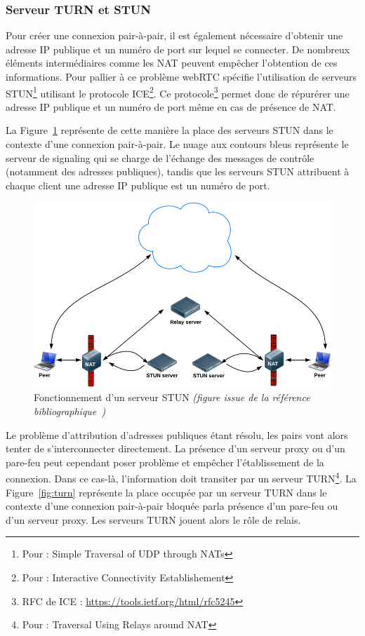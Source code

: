 \documentclass{tnreport}
\begin{document}
\subsubsection{Serveur TURN et STUN}

Pour créer une connexion pair-à-pair, il est également nécessaire d'obtenir une adresse IP publique et un numéro de port sur lequel se connecter. De nombreux éléments intermédiaires comme les NAT peuvent empêcher l'obtention de ces informations. Pour pallier à ce problème webRTC spécifie l'utilisation de serveurs STUN\footnote{Pour : Simple Traversal of UDP through NATs} utilisant le protocole ICE\footnote{Pour : Interactive Connectivity Establishement}. Ce protocole\footnote{RFC de ICE : \url{https://tools.ietf.org/html/rfc5245}} permet donc de répurérer une adresse IP publique et un numéro de port même en cas de présence de NAT.

La Figure~\ref{fig:stun} représente de cette manière la place des serveurs STUN dans le contexte d'une connexion pair-à-pair. Le nuage aux contours bleus représente le serveur de signaling qui se charge de l'échange des messages de contrôle (notamment des adresses publiques), tandis que les serveurs STUN attribuent à chaque client une adresse IP publique est un numéro de port.

\begin{figure}[!h]
  \centering
  \includegraphics[width=14cm]{figures/stun}
  \caption{Fonctionnement d'un serveur STUN \emph{(figure issue de la référence bibliographique~\cite{GettingStartedwithWebRTC})}}
  \label{fig:stun}
\end{figure}

Le problème d'attribution d'adresses publiques étant résolu, les pairs vont alors tenter de s'interconnecter directement. La présence d'un serveur proxy ou d'un pare-feu peut cependant poser problème et empêcher l'établissement de la connexion. Dans ce cas-là, l'information doit transiter par un serveur TURN\footnote{Pour : Traversal Using Relays around NAT}. La Figure~\ref{fig:turn} représente la place occupée par un serveur TURN dans le contexte d'une connexion pair-à-pair bloquée parla présence d'un pare-feu ou d'un serveur proxy. Les serveurs TURN jouent alors le rôle de relais.
\end{document}
